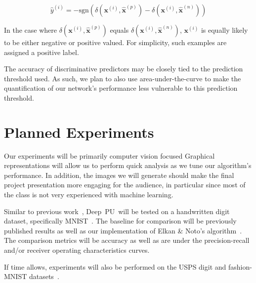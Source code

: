 \documentclass[10pt]{article}
\newcommand{\sign}[1]{\text{sgn}\left( #1 \right) }
\newcommand{\toolname}{Deep~PU}
\newcommand{\xI}[1]{\mathbf{x}^{(#1)}}
\newcommand{\xPred}[1]{\mathbf{\hat{x}}^{\left(#1\right)}}
\newcommand{\xP}{\xPred{p}}
\newcommand{\xN}{\xPred{n}}
\newcommand{\puDist}[2]{\delta\left(#1, #2\right)}
\newcommand{\puDistDiff}{\puDist{\xI{i}}{\xP} - \puDist{\xI{i}}{\xN}}
\begin{document}
  \begin{equation}\label{eq:PU:ClassificationFunc}
    \hat{y}^{\left( i \right)} = -\sign{\puDistDiff}
  \end{equation}

  In the case where $\puDist{\xI{i}}{\xP}$ equals $\puDist{\xI{i}}{\xN}$, $\xI{i}$ is equally likely to be either negative or positive valued.  For simplicity, such examples are assigned a positive label. %

  The accuracy of discriminative predictors may be closely tied to the prediction threshold used.  As such, we plan to also use area-under-the-curve to make the quantification of our network's performance less vulnerable to this prediction threshold.

\section{Planned Experiments}

Our experiments will be primarily computer vision focused  Graphical representations will allow us to perform quick analysis as we tune our algorithm's performance.  In addition, the images we will generate should make the final project presentation more engaging for the audience, in particular since most of the class is not very experienced with machine learning.

Similar to previous work~\cite{Ghasemi:2016,duPlessis:2014,Claesen:2015}, \toolname\ will be tested on a handwritten digit dataset, specifically MNIST~\cite{LeCun:1999}.  The baseline for comparison will be previously published results as well as our implementation of Elkan \& Noto's algorithm~\cite{Elkan:2008}.  The comparison metrics will be accuracy as well as are under the precision-recall and/or receiver operating characteristics curves.

If time allows, experiments will also be performed on the USPS digit and fashion-MNIST  datasets~\cite{FashionMNIST}.



\end{document}
